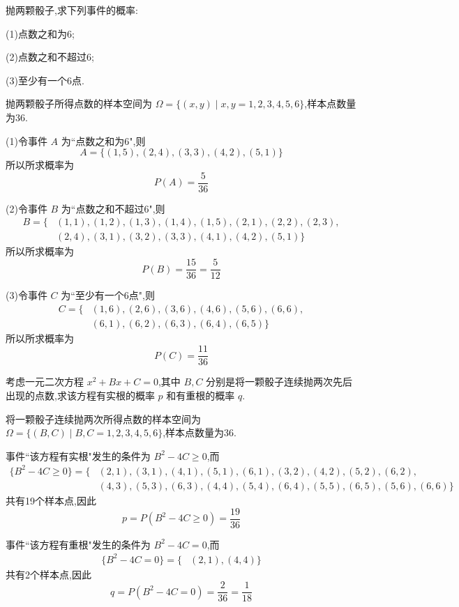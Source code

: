 \question 抛两颗骰子,求下列事件的概率:

(1)点数之和为6;

(2)点数之和不超过6;

(3)至少有一个6点.

\begin{solution}
    抛两颗骰子所得点数的样本空间为 $\varOmega = \{ (x,y) \mid x,y=1,2,3,4,5,6 \}$,样本点数量为36.

    (1)令事件 $A$ 为``点数之和为6",则
    $$
    A = \{ (1,5), (2,4), (3,3), (4,2), (5,1) \}
    $$
    所以所求概率为
    $$
    P(A) = \dfrac{5}{36}
    $$

    (2)令事件 $B$ 为``点数之和不超过6",则
    $$
    \begin{aligned}
        B = \{ & (1,1), (1,2), (1,3), (1,4), (1,5), (2,1), (2,2), (2,3), \\
        & (2,4), (3,1), (3,2), (3,3), (4,1), (4,2), (5,1) \}
    \end{aligned}
    $$
    所以所求概率为
    $$
    P(B) = \dfrac{15}{36} = \dfrac{5}{12}
    $$

    (3)令事件 $C$ 为``至少有一个6点",则
    $$
    \begin{aligned}
        C = \{ & (1,6), (2,6), (3,6), (4,6), (5,6), (6,6), \\
        & (6,1), (6,2), (6,3), (6,4), (6,5) \}
    \end{aligned}
    $$
    所以所求概率为
    $$
    P(C) = \dfrac{11}{36}
    $$
\end{solution}

\question 考虑一元二次方程 $x^2 + Bx + C = 0$,其中 $B,C$ 分别是将一颗骰子连续抛两次先后出现的点数,求该方程有实根的概率 $p$ 和有重根的概率 $q$.

\begin{solution}
    将一颗骰子连续抛两次所得点数的样本空间为 $\varOmega = \{ (B,C) \mid B,C=1,2,3,4,5,6 \}$,样本点数量为36.
    
    事件``该方程有实根"发生的条件为 $B^2 - 4C \geqslant 0$,而
    $$
    \begin{aligned}
        \{ B^2 - 4C \geqslant 0 \} = \{ & (2,1), (3,1), (4,1), (5,1), (6,1), (3,2), (4,2), (5,2), (6,2), \\
        & (4,3), (5,3), (6,3), (4,4), (5,4), (6,4), (5,5), (6,5), (5,6), (6,6) \}
    \end{aligned}
    $$
    共有19个样本点,因此
    $$
    p = P(B^2 - 4C \geqslant 0) = \dfrac{19}{36}
    $$

    事件``该方程有重根"发生的条件为 $B^2 - 4C = 0$,而
    $$
    \begin{aligned}
        \{ B^2 - 4C = 0 \} = \{ & (2,1), (4,4) \}
    \end{aligned}
    $$
    共有2个样本点,因此
    $$
    q = P(B^2 - 4C = 0) = \dfrac{2}{36} = \dfrac{1}{18}
    $$
\end{solution}

